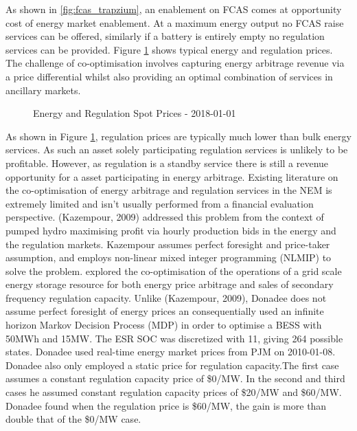 As shown in \ref{fig:fcas_trapzium}, an enablement on FCAS comes at opportunity cost of energy market enablement. At a maximum energy output no FCAS raise services can be offered, similarly if a battery is entirely empty no regulation services can be provided. Figure \ref{fig:energy_and_reg} shows typical energy and regulation prices. The challenge of co-optimisation involves capturing energy arbitrage revenue via a price differential whilst also providing an optimal combination of services in ancillary markets.
\begin{figure}[H]
    \centering
    \caption{Energy and Regulation Spot Prices - 2018-01-01}
    \label{fig:energy_and_reg}
\end{figure}
As shown in Figure \ref{fig:energy_and_reg}, regulation prices are typically much lower than bulk energy services. As such an asset solely participating regulation services is unlikely to be profitable. However, as regulation is a standby service there is still a revenue opportunity for a asset participating in energy arbitrage.
\newline
\newline
Existing literature on the co-optimisation of energy arbitrage and regulation services in the NEM is extremely limited and isn't usually performed from a financial evaluation perspective. 
(Kazempour, 2009) addressed this problem from the context of pumped hydro maximising profit via hourly production bids in the energy and the regulation markets. Kazempour assumes perfect foresight and price-taker assumption, and employs non-linear mixed integer programming (NLMIP) to solve the problem. 
\newline 
\newline 
\parencite{Donadee} explored the co-optimisation of the operations of a grid scale energy storage resource for both energy price arbitrage and sales of secondary frequency regulation capacity. Unlike (Kazempour, 2009), Donadee does not assume perfect foresight of energy prices an consequentially used an infinite horizon Markov Decision Process  (MDP) in order to optimise a BESS with 50MWh and 15MW.  The ESR SOC was discretized with 11, giving 264 possible states. Donadee used real-time energy market prices from PJM on 2010-01-08. Donadee also only employed a static price for regulation capacity.The first case assumes a constant regulation capacity price of \$0/MW. In the second and third cases he assumed constant regulation capacity prices of \$20/MW and \$60/MW. Donadee found when the regulation price is \$60/MW, the gain is more than double that of the \$0/MW case. 
